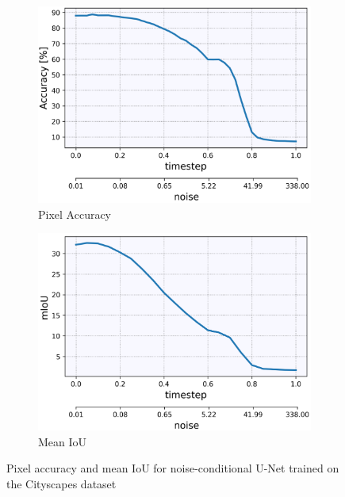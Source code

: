 %
\begin{figure}[] \label{fig:3.2}
    \centering
    \begin{subfigure}[b]{0.49\textwidth}
        \centering
         \includegraphics[width=\textwidth]{Chapters/figures/experiments/cityscapes/accuracy_cityscapes.PNG}
         \caption{Pixel Accuracy}
    \end{subfigure}
    \begin{subfigure}[b]{0.49\textwidth}
        \centering
         \includegraphics[width=\textwidth]{Chapters/figures/experiments/cityscapes/mIoU_cityscapes.PNG}
         \caption{Mean IoU}
    \end{subfigure}
    \caption[Pixel accuracy and mIoU for U-Net on Cityscapes dataset]{Pixel accuracy and mean IoU for noise-conditional U-Net trained on the Cityscapes dataset}
\end{figure}
%
